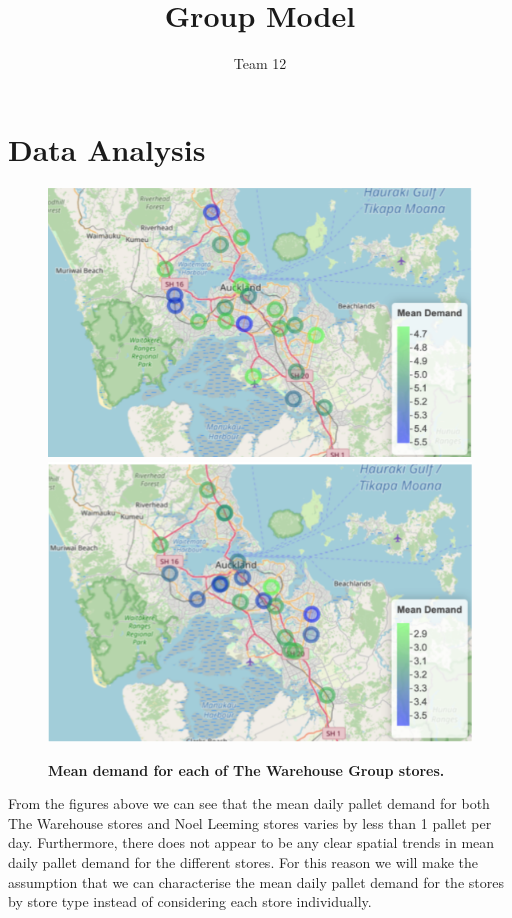 \documentclass[11pt, a4paper]{article}   	%
\title{Group Model}
\author{Team 12}
\begin{document}
\maketitle
\section{Data Analysis}

\begin{figure}[H]\centering
\includegraphics[scale=0.35]{D1}
\includegraphics[scale=0.35]{D2}
\caption{\textbf{Mean demand for each of The Warehouse Group stores.}}
\end{figure}

From the figures above we can see that the mean daily pallet demand for both The Warehouse stores and Noel Leeming stores varies by less than 1 pallet per day. Furthermore, there does not appear to be any clear spatial trends in mean daily pallet demand for the different stores. For this reason we will make the assumption that we can characterise the mean daily pallet demand for the stores by store type instead of considering each store individually.
\end{document}
